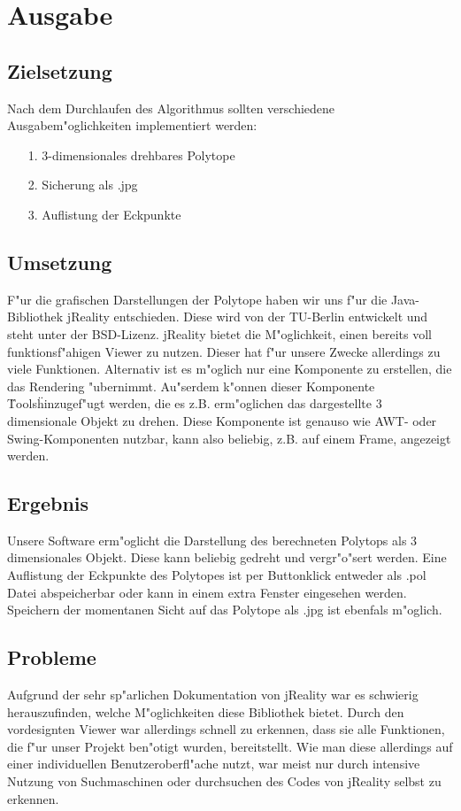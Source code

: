 \documentclass[11pt]{article}
\begin{document}
\section{Ausgabe}
\subsection{Zielsetzung}
Nach dem Durchlaufen des Algorithmus sollten verschiedene Ausgabem"oglichkeiten implementiert werden:
\begin{itemize}
\item[1.] 3-dimensionales drehbares Polytope
\item[2.] Sicherung als .jpg
\item[3.] Auflistung der Eckpunkte
\end{itemize}
\subsection{Umsetzung}
F"ur die grafischen Darstellungen der Polytope haben wir uns f"ur die Java-Bibliothek jReality entschieden. Diese wird von der TU-Berlin entwickelt und steht unter der BSD-Lizenz.
jReality bietet die M"oglichkeit, einen bereits voll funktionsf"ahigen Viewer zu nutzen. Dieser hat f"ur unsere Zwecke allerdings zu viele Funktionen. Alternativ ist es m"oglich nur eine Komponente zu erstellen, die das Rendering "ubernimmt. Au"serdem k"onnen dieser Komponente \"Tools\" hinzugef"ugt werden, die es z.B. erm"oglichen das dargestellte 3 dimensionale Objekt zu drehen. Diese Komponente ist genauso wie AWT- oder Swing-Komponenten nutzbar, kann also beliebig, z.B. auf einem Frame, angezeigt werden.
\subsection{Ergebnis}
Unsere Software erm"oglicht die Darstellung des berechneten Polytops als 3 dimensionales Objekt. Diese kann beliebig gedreht und vergr"o"sert werden. Eine Auflistung der Eckpunkte des Polytopes ist per Buttonklick entweder als .pol Datei abspeicherbar oder kann in einem extra Fenster eingesehen werden.
Speichern der momentanen Sicht auf das Polytope als .jpg ist ebenfals m"oglich.
\subsection{Probleme}
Aufgrund der sehr sp"arlichen Dokumentation von jReality war es schwierig herauszufinden, welche M"oglichkeiten diese Bibliothek bietet. Durch den vordesignten Viewer war allerdings schnell zu erkennen, dass sie alle Funktionen, die f"ur unser Projekt ben"otigt wurden, bereitstellt. Wie man diese allerdings auf einer individuellen Benutzeroberfl"ache nutzt, war meist nur durch intensive Nutzung von Suchmaschinen oder durchsuchen des Codes von jReality selbst zu erkennen.
\end{document}
